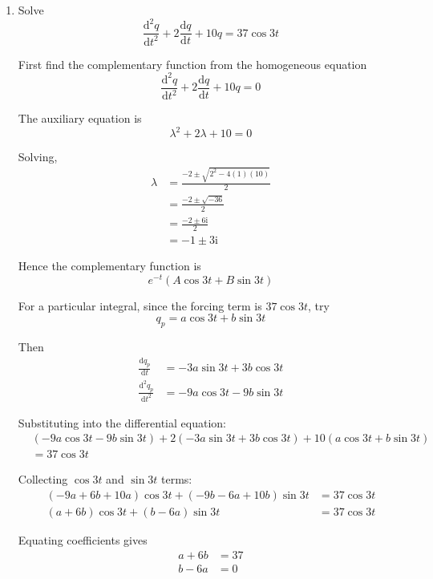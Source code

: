 \documentclass[leqno]{article}
\begin{document}
\begin{enumerate}[
  label=\textbf{\arabic*.},
  leftmargin=*,
  topsep=0pt,
  partopsep=0pt,
  parsep=0pt
]
\begin{tcolorbox}[colback=white, colframe=scarlet, title={\textbf{Solution}}, breakable, grow to left by=6mm, grow to right by=10mm]
\begin{enumerate}[label=\textbf{(\alph*)}]
  \item Solve
  \[
  \frac{\mathrm{d}^2q}{\mathrm{d}t^2}+2\frac{\mathrm{d}q}{\mathrm{d}t}+10q=37\cos 3t
  \]

  First find the complementary function from the homogeneous equation
  \[
  \frac{\mathrm{d}^2q}{\mathrm{d}t^2}+2\frac{\mathrm{d}q}{\mathrm{d}t}+10q=0
  \]

  The auxiliary equation is
  \[
  \lambda^2+2\lambda+10=0
  \]

  Solving,
  \begin{align*}
  \lambda&=\frac{-2\pm\sqrt{2^2-4(1)(10)}}{2} \\
  &=\frac{-2\pm\sqrt{-36}}{2} \\
  &=\frac{-2\pm 6\mathrm{i}}{2} \\
  &=-1\pm 3\mathrm{i}
  \end{align*}

  Hence the complementary function is
  \[
  e^{-t}(A\cos 3t+B\sin 3t)
  \]

  For a particular integral, since the forcing term is \(37\cos 3t\), try
  \[
  q_p=a\cos 3t+b\sin 3t
  \]

  Then
  \begin{align*}
  \frac{\mathrm{d}q_p}{\mathrm{d}t}&=-3a\sin 3t+3b\cos 3t \\
  \frac{\mathrm{d}^2q_p}{\mathrm{d}t^2}&=-9a\cos 3t-9b\sin 3t
  \end{align*}

  Substituting into the differential equation:
  \begin{align*}
  &(-9a\cos 3t-9b\sin 3t)+2(-3a\sin 3t+3b\cos 3t)+10(a\cos 3t+b\sin 3t) \\
  &=37\cos 3t
  \end{align*}

  Collecting \(\cos 3t\) and \(\sin 3t\) terms:
  \begin{align*}
  (-9a+6b+10a)\cos 3t+(-9b-6a+10b)\sin 3t&=37\cos 3t \\
  (a+6b)\cos 3t+(b-6a)\sin 3t&=37\cos 3t
  \end{align*}

  Equating coefficients gives
  \begin{align*}
  a+6b&=37 \\
  b-6a&=0
  \end{align*}


\end{enumerate}
\end{tcolorbox}
\end{enumerate}
\end{document}
